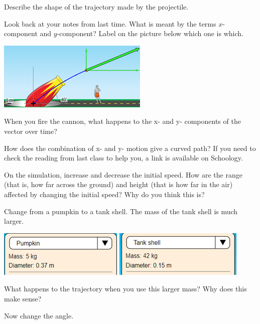 \documentclass[10pt]{exam}
\begin{document}
\begin{questions}
  \question
    Describe the shape of the trajectory made by the projectile.\vs

  \question
    Look back at your notes from last time.  What is meant by the terms $x$-component and $y$-component?  Label on the picture below which one is which.

    \includegraphics{xy.png}

  \question
    When you fire the cannon, what happens to the x- and y- components of the vector over time? \vs
    
    
  \question
    How does the combination of x- and y- motion give a curved path?  If you need to check the reading from last class to help you, a link is available on Schoology.\vs


  \pagebreak
    
  \question
    On the simulation, increase and decrease the initial speed. How are the range (that is, how far across the ground) and height (that is how far in the air) affected by changing the initial speed? Why do you think this is? \vs
    
  \question
    Change from a pumpkin to a tank shell.  The mass of the tank shell is much larger.  

    \includegraphics{pumpkin.png} \includegraphics{tankshell.png}
      
    What happens to the trajectory when you use this larger mass?  Why does this make sense? \vs[2]
    
   \question
    Now change the angle.
    
    \begin{parts}

\end{parts}
\end{questions}
\end{document}
